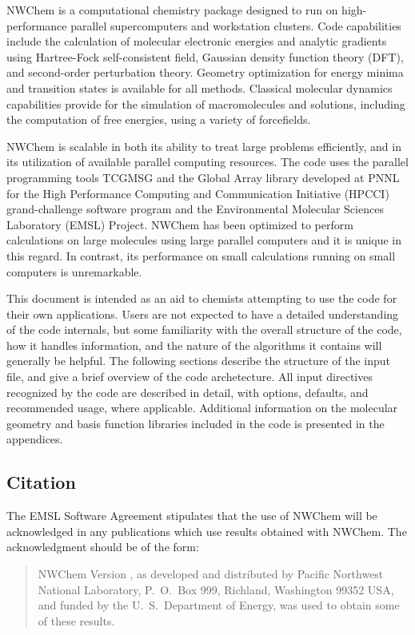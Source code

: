 \label{sec:intro}

NWChem is a computational chemistry package designed to run on
high-performance parallel supercomputers and workstation clusters.
Code capabilities include the calculation of molecular electronic
energies and analytic gradients using Hartree-Fock self-consistent field, Gaussian
density function theory (DFT), and second-order perturbation theory.
Geometry optimization for energy minima and transition states is
available for all methods.  Classical molecular dynamics capabilities
provide for the simulation of macromolecules and solutions, including
the computation of free energies, using a variety of forcefields.

NWChem is scalable in both its ability to treat large problems
efficiently, and in its utilization of available parallel computing
resources.  The code uses the parallel programming tools TCGMSG and
the Global Array library developed at PNNL for the High Performance
Computing and Communication Initiative (HPCCI) grand-challenge
software program and the Environmental Molecular Sciences Laboratory
(EMSL) Project.  NWChem has been optimized to perform calculations on
large molecules using large parallel computers and it is unique in
this regard.  In contrast, its performance on small calculations
running on small computers is unremarkable.

This document is intended as an aid to chemists attempting to
use the code for their own applications.  Users are not expected to
have a detailed understanding of the code internals, but some
familiarity with the overall structure of the code, how it handles
information, and the nature of the algorithms it contains will
generally be helpful.  The following sections describe the structure
of the input file, and give a brief overview of the code
archetecture.  All input directives recognized by the code are
described in detail, with options, defaults, and recommended usage,
where applicable.  Additional information on the molecular geometry
and basis function libraries included in the code is presented in the
appendices.

\subsection{Citation}

The EMSL Software Agreement stipulates that the use of NWChem will be
acknowledged in any publications which use results obtained with
NWChem.  The acknowledgment should be of the form:
\begin{quote}

  NWChem Version \nwchemversion, as developed and distributed by
  Pacific Northwest National Laboratory, P.~O.~Box 999, Richland,
  Washington 99352 USA, and funded by the U.~S.~Department of Energy,
  was used to obtain some of these results.
\end{quote}

